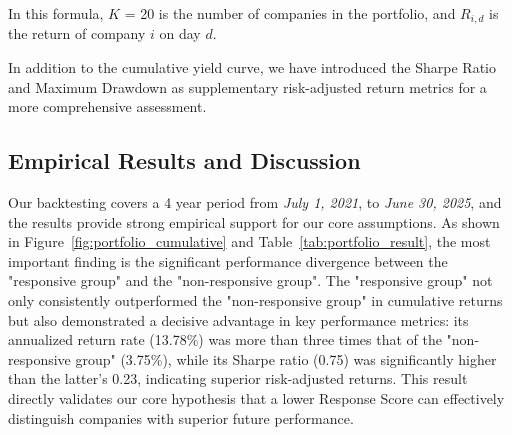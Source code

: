 \documentclass[sigconf]{acmart}
\begin{document}
In this formula, $K$ = 20 is the number of companies in the portfolio, and $R_{i,d}$ is the return of company $i$ on day $d$.

In addition to the cumulative yield curve, we have introduced the Sharpe Ratio and Maximum Drawdown as supplementary risk-adjusted return metrics for a more comprehensive assessment.

\subsection{Empirical Results and Discussion}

Our backtesting covers a 4 year period from \textit{July 1, 2021}, to \textit{June 30, 2025}, and the results provide strong empirical support for our core assumptions. As shown in Figure~\ref{fig:portfolio_cumulative} and Table~\ref{tab:portfolio_result}, the most important finding is the significant performance divergence between the "responsive group" and the "non-responsive group". The "responsive group" not only consistently outperformed the "non-responsive group" in cumulative returns but also demonstrated a decisive advantage in key performance metrics: its annualized return rate (13.78\%) was more than three times that of the "non-responsive group" (3.75\%), while its Sharpe ratio (0.75) was significantly higher than the latter's 0.23, indicating superior risk-adjusted returns. This result directly validates our core hypothesis that a lower Response Score can effectively distinguish companies with superior future performance.



\begin{table}[t]
\centering
\setlength{\tabcolsep}{3pt}
\renewcommand{\arraystretch}{1.2}
\caption{Key Performance Metrics of Portfolios}
\label{tab:portfolio_result}
\end{table}
\end{document}
